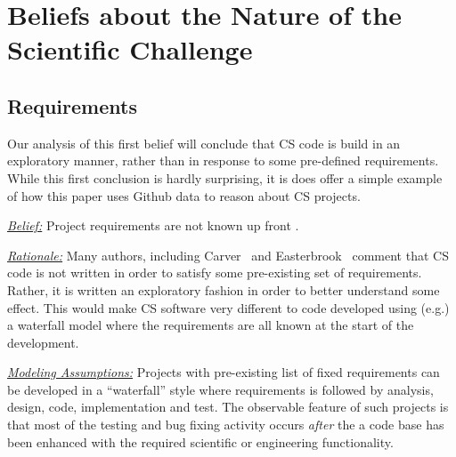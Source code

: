 \documentclass[sigconf,review,anonymous]{acmart}
\begin{document}
\section{Beliefs about the Nature of the Scientific Challenge}


\subsection{Requirements}
Our analysis of this first belief will  conclude that
CS code is build in an exploratory manner,
rather than in response to some pre-defined
requirements. While this first conclusion is hardly
surprising, it is does offer a simple example
of how this paper  uses Github
data to reason about CS projects.

\noindent  \textit{\underline{Belief:}} Project requirements are not known up front \cite{segal08_ss, carver07_environment, segal05_ss, basili08_hpc, easterbrook_cs}.




\noindent \textit{\underline{Rationale:}} 
Many authors, including Carver~\cite{carver07_environment}
and Easterbrook~\cite{easterbrook_cs}
comment that CS code is  not written in order
to satisfy some pre-existing set of requirements.
Rather, it is written  an exploratory fashion in order
to better understand some effect. 
This would make CS software very different to code developed using (e.g.) a waterfall model where the requirements
are all known at the start of the development.


 



\noindent \textit{\underline{Modeling Assumptions:}} 
Projects with pre-existing list of fixed requirements 
can be developed in a ``waterfall'' style
where requirements is followed by analysis,
design, code, implementation and test.
The observable feature of such projects
is that most of the testing and bug fixing
activity occurs {\em after} the a code base
has been enhanced with the required
scientific or engineering functionality.
\end{document}
